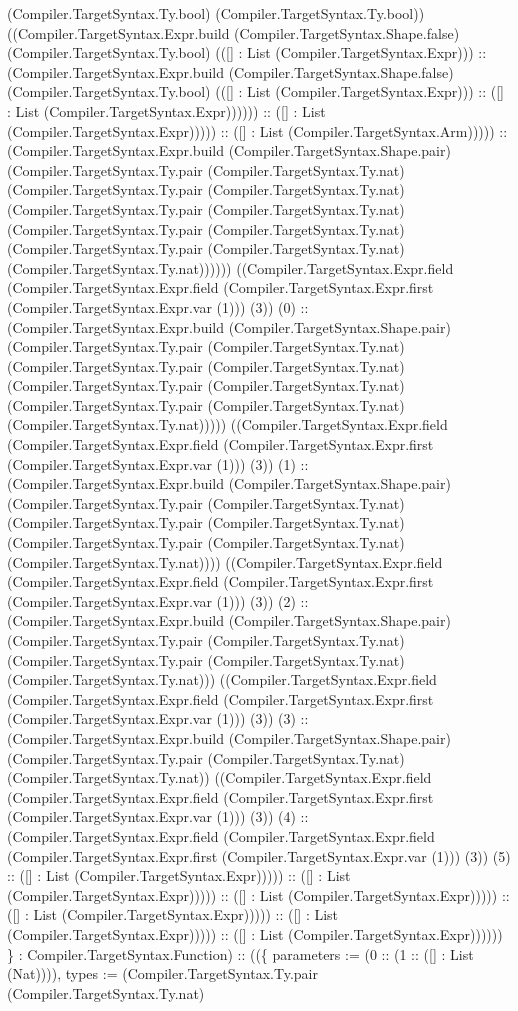 \documentclass[11pt]{article}
\begin{document}
(Compiler.TargetSyntax.Ty.bool) (Compiler.TargetSyntax.Ty.bool)) ((Compiler.TargetSyntax.Expr.build (Compiler.TargetSyntax.Shape.false) (Compiler.TargetSyntax.Ty.bool) (([] : List (Compiler.TargetSyntax.Expr))) :: (Compiler.TargetSyntax.Expr.build (Compiler.TargetSyntax.Shape.false) (Compiler.TargetSyntax.Ty.bool) (([] : List (Compiler.TargetSyntax.Expr))) :: ([] : List (Compiler.TargetSyntax.Expr)))))) :: ([] : List (Compiler.TargetSyntax.Expr))))) :: ([] : List (Compiler.TargetSyntax.Arm))))) :: (Compiler.TargetSyntax.Expr.build (Compiler.TargetSyntax.Shape.pair) (Compiler.TargetSyntax.Ty.pair (Compiler.TargetSyntax.Ty.nat) (Compiler.TargetSyntax.Ty.pair (Compiler.TargetSyntax.Ty.nat) (Compiler.TargetSyntax.Ty.pair (Compiler.TargetSyntax.Ty.nat) (Compiler.TargetSyntax.Ty.pair (Compiler.TargetSyntax.Ty.nat) (Compiler.TargetSyntax.Ty.pair (Compiler.TargetSyntax.Ty.nat) (Compiler.TargetSyntax.Ty.nat)))))) ((Compiler.TargetSyntax.Expr.field (Compiler.TargetSyntax.Expr.field (Compiler.TargetSyntax.Expr.first (Compiler.TargetSyntax.Expr.var (1))) (3)) (0) :: (Compiler.TargetSyntax.Expr.build (Compiler.TargetSyntax.Shape.pair) (Compiler.TargetSyntax.Ty.pair (Compiler.TargetSyntax.Ty.nat) (Compiler.TargetSyntax.Ty.pair (Compiler.TargetSyntax.Ty.nat) (Compiler.TargetSyntax.Ty.pair (Compiler.TargetSyntax.Ty.nat) (Compiler.TargetSyntax.Ty.pair (Compiler.TargetSyntax.Ty.nat) (Compiler.TargetSyntax.Ty.nat))))) ((Compiler.TargetSyntax.Expr.field (Compiler.TargetSyntax.Expr.field (Compiler.TargetSyntax.Expr.first (Compiler.TargetSyntax.Expr.var (1))) (3)) (1) :: (Compiler.TargetSyntax.Expr.build (Compiler.TargetSyntax.Shape.pair) (Compiler.TargetSyntax.Ty.pair (Compiler.TargetSyntax.Ty.nat) (Compiler.TargetSyntax.Ty.pair (Compiler.TargetSyntax.Ty.nat) (Compiler.TargetSyntax.Ty.pair (Compiler.TargetSyntax.Ty.nat) (Compiler.TargetSyntax.Ty.nat)))) ((Compiler.TargetSyntax.Expr.field (Compiler.TargetSyntax.Expr.field (Compiler.TargetSyntax.Expr.first (Compiler.TargetSyntax.Expr.var (1))) (3)) (2) :: (Compiler.TargetSyntax.Expr.build (Compiler.TargetSyntax.Shape.pair) (Compiler.TargetSyntax.Ty.pair (Compiler.TargetSyntax.Ty.nat) (Compiler.TargetSyntax.Ty.pair (Compiler.TargetSyntax.Ty.nat) (Compiler.TargetSyntax.Ty.nat))) ((Compiler.TargetSyntax.Expr.field (Compiler.TargetSyntax.Expr.field (Compiler.TargetSyntax.Expr.first (Compiler.TargetSyntax.Expr.var (1))) (3)) (3) :: (Compiler.TargetSyntax.Expr.build (Compiler.TargetSyntax.Shape.pair) (Compiler.TargetSyntax.Ty.pair (Compiler.TargetSyntax.Ty.nat) (Compiler.TargetSyntax.Ty.nat)) ((Compiler.TargetSyntax.Expr.field (Compiler.TargetSyntax.Expr.field (Compiler.TargetSyntax.Expr.first (Compiler.TargetSyntax.Expr.var (1))) (3)) (4) :: (Compiler.TargetSyntax.Expr.field (Compiler.TargetSyntax.Expr.field (Compiler.TargetSyntax.Expr.first (Compiler.TargetSyntax.Expr.var (1))) (3)) (5) :: ([] : List (Compiler.TargetSyntax.Expr))))) :: ([] : List (Compiler.TargetSyntax.Expr))))) :: ([] : List (Compiler.TargetSyntax.Expr))))) :: ([] : List (Compiler.TargetSyntax.Expr))))) :: ([] : List (Compiler.TargetSyntax.Expr))))) :: ([] : List (Compiler.TargetSyntax.Expr)))))) \} : Compiler.TargetSyntax.Function) :: ((\{ parameters := (0 :: (1 :: ([] : List (Nat)))), types := (Compiler.TargetSyntax.Ty.pair (Compiler.TargetSyntax.Ty.nat) 
\end{document}
